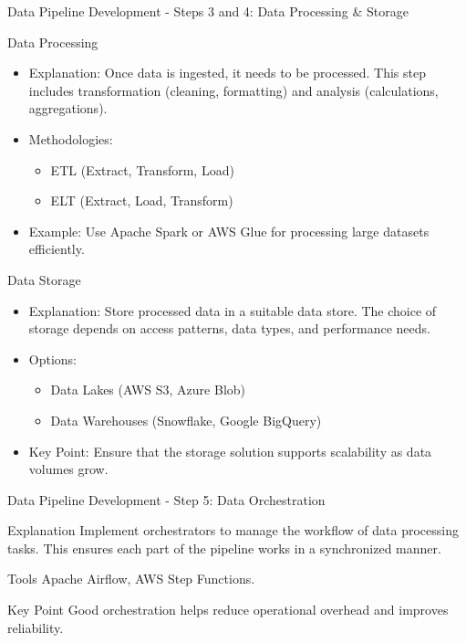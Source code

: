 \documentclass[aspectratio=169]{beamer}
\begin{document}
\begin{frame}[fragile]{Data Pipeline Development - Steps 3 and 4: Data Processing & Storage}
    \begin{block}{Data Processing}
        \begin{itemize}
            \item Explanation: Once data is ingested, it needs to be processed. This step includes transformation (cleaning, formatting) and analysis (calculations, aggregations).
            \item Methodologies: 
                \begin{itemize}
                    \item ETL (Extract, Transform, Load)
                    \item ELT (Extract, Load, Transform)
                \end{itemize}
            \item Example: Use Apache Spark or AWS Glue for processing large datasets efficiently.
        \end{itemize}
    \end{block}
    
    \begin{block}{Data Storage}
        \begin{itemize}
            \item Explanation: Store processed data in a suitable data store. The choice of storage depends on access patterns, data types, and performance needs.
            \item Options:
                \begin{itemize}
                    \item Data Lakes (AWS S3, Azure Blob)
                    \item Data Warehouses (Snowflake, Google BigQuery)
                \end{itemize}
            \item Key Point: Ensure that the storage solution supports scalability as data volumes grow.
        \end{itemize}
    \end{block}
\end{frame}

\begin{frame}[fragile]{Data Pipeline Development - Step 5: Data Orchestration}
    \begin{block}{Explanation}
        Implement orchestrators to manage the workflow of data processing tasks. This ensures each part of the pipeline works in a synchronized manner.
    \end{block}
    
    \begin{block}{Tools}
        Apache Airflow, AWS Step Functions.
    \end{block}
    
    \begin{block}{Key Point}
        Good orchestration helps reduce operational overhead and improves reliability.
    \end{block}
\end{frame}
\end{document}
